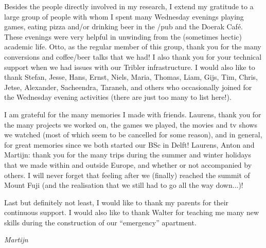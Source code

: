 Besides the people directly involved in my research, I extend my gratitude to a large group of people with whom I spent many Wednesday evenings playing games, eating pizza and/or drinking beer in the /pub and the Doerak Café.
These evenings were very helpful in unwinding from the (sometimes hectic) academic life.
Otto, as the regular member of this group, thank you for the many conversions and coffee/beer talks that we had!
I also thank you for your technical support when we had issues with our Tribler infrastructure.
I would also like to thank Stefan, Jesse, Hans, Ernst, Niels, Maria, Thomas, Liam, Gijs, Tim, Chris, Jetse, Alexander, Sacheendra, Taraneh, and others who occasionally joined for the Wednesday evening activities (there are just too many to list here!).

I am grateful for the many memories I made with friends.
Laurens, thank you for the many projects we worked on, the games we played, the movies and tv shows we watched (most of which seem to be cancelled for some reason), and in general, for great memories since we both started our BSc in Delft!
Laurens, Anton and Martijn: thank you for the many trips during the summer and winter holidays that we made within and outside Europe, and whether or not accompanied by others.
I will never forget that feeling after we (finally) reached the summit of Mount Fuji (and the realisation that we still had to go all the way down...)!\emojifuji{}

Last but definitely not least, I would like to thank my parents for their continuous support.
I would also like to thank Walter for teaching me many new skills during the construction of our \enquote{emergency} apartment.

\begin{flushright}
{\makeatletter\itshape
    Martijn
\makeatother}
\end{flushright}
